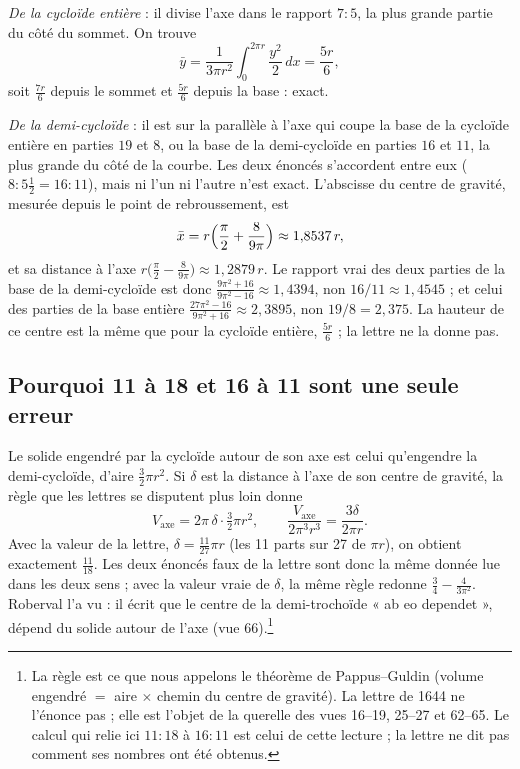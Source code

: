 \documentclass[11pt,a4paper]{article}
\begin{document}
\emph{De la cycloïde entière} : il divise l'axe dans le rapport $7:5$, la plus
grande partie du côté du sommet. On trouve
\[
\bar y = \frac{1}{3\pi r^2}\int_0^{2\pi r}\frac{y^2}{2}\,dx = \frac{5r}{6},
\]
soit $\tfrac{7r}{6}$ depuis le sommet et $\tfrac{5r}{6}$ depuis la base : exact.

\emph{De la demi-cycloïde} : il est sur la parallèle à l'axe qui coupe la base de
la cycloïde entière en parties $19$ et $8$, ou la base de la demi-cycloïde en
parties $16$ et $11$, la plus grande du côté de la courbe. Les deux énoncés
s'accordent entre eux ($8 : 5\tfrac12 = 16:11$), mais ni l'un ni l'autre n'est
exact. L'abscisse du centre de gravité, mesurée depuis le point de rebroussement,
est
\[
\bar x = r\Bigl(\frac{\pi}{2}+\frac{8}{9\pi}\Bigr)\approx 1{,}8537\,r ,
\]
et sa distance à l'axe $r\bigl(\frac{\pi}{2}-\frac{8}{9\pi}\bigr)\approx
1{,}2879\,r$. Le rapport vrai des deux parties de la base de la demi-cycloïde est
donc $\frac{9\pi^2+16}{9\pi^2-16}\approx 1{,}4394$, non $16/11\approx 1{,}4545$ ;
et celui des parties de la base entière $\frac{27\pi^2-16}{9\pi^2+16}\approx
2{,}3895$, non $19/8=2{,}375$. La hauteur de ce centre est la même que pour la
cycloïde entière, $\tfrac{5r}{6}$ ; la lettre ne la donne pas.

\subsection*{Pourquoi 11 à 18 et 16 à 11 sont une seule erreur}

Le solide engendré par la cycloïde autour de son axe est celui qu'engendre la
demi-cycloïde, d'aire $\tfrac32\pi r^2$. Si $\delta$ est la distance à l'axe de
son centre de gravité, la règle que les lettres se disputent plus loin donne
\[
V_{\text{axe}} = 2\pi\,\delta\cdot\tfrac32\pi r^2 ,\qquad
\frac{V_{\text{axe}}}{2\pi^3r^3} = \frac{3\delta}{2\pi r}.
\]
Avec la valeur de la lettre, $\delta = \tfrac{11}{27}\pi r$ (les 11 parts sur 27
de $\pi r$), on obtient exactement $\tfrac{11}{18}$. Les deux énoncés faux
de la lettre sont donc la même donnée lue dans les deux sens ; avec la valeur
vraie de $\delta$, la même règle redonne $\frac34-\frac{4}{3\pi^2}$. Roberval
l'a vu : il écrit que le centre de la demi-trochoïde « ab eo dependet », dépend
du solide autour de l'axe (vue 66).\footnote{La règle est ce que nous appelons
le théorème de Pappus–Guldin (volume engendré $=$ aire $\times$ chemin du centre
de gravité). La lettre de 1644 ne l'énonce pas ; elle est l'objet de la querelle
des vues 16--19, 25--27 et 62--65. Le calcul qui relie ici $11:18$ à $16:11$ est
celui de cette lecture ; la lettre ne dit pas comment ses nombres ont été
obtenus.}
\end{document}
